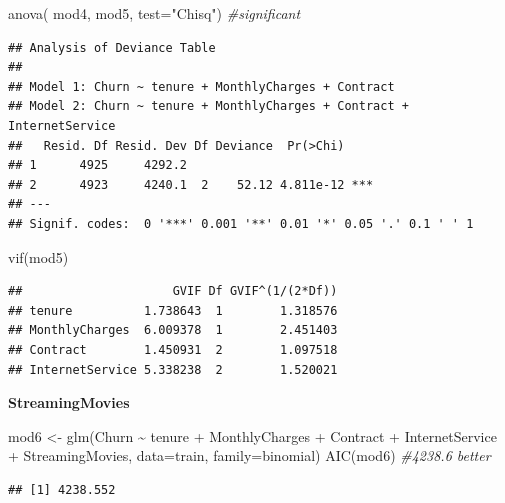 \documentclass[
  twoside]{article}
\newenvironment{Shaded}{\begin{snugshade}}{\end{snugshade}}
\newcommand{\AttributeTok}[1]{\textcolor[rgb]{0.77,0.63,0.00}{#1}}
\newcommand{\CommentTok}[1]{\textcolor[rgb]{0.56,0.35,0.01}{\textit{#1}}}
\newcommand{\FunctionTok}[1]{\textcolor[rgb]{0.00,0.00,0.00}{#1}}
\newcommand{\NormalTok}[1]{#1}
\newcommand{\OtherTok}[1]{\textcolor[rgb]{0.56,0.35,0.01}{#1}}
\newcommand{\SpecialCharTok}[1]{\textcolor[rgb]{0.00,0.00,0.00}{#1}}
\newcommand{\StringTok}[1]{\textcolor[rgb]{0.31,0.60,0.02}{#1}}
\begin{document}
\begin{Shaded}
\begin{Highlighting}[]
\FunctionTok{anova}\NormalTok{( mod4, mod5,  }\AttributeTok{test=}\StringTok{"Chisq"}\NormalTok{) }\CommentTok{\#significant}
\end{Highlighting}
\end{Shaded}

\begin{verbatim}
## Analysis of Deviance Table
## 
## Model 1: Churn ~ tenure + MonthlyCharges + Contract
## Model 2: Churn ~ tenure + MonthlyCharges + Contract + InternetService
##   Resid. Df Resid. Dev Df Deviance  Pr(>Chi)    
## 1      4925     4292.2                          
## 2      4923     4240.1  2    52.12 4.811e-12 ***
## ---
## Signif. codes:  0 '***' 0.001 '**' 0.01 '*' 0.05 '.' 0.1 ' ' 1
\end{verbatim}

\begin{Shaded}
\begin{Highlighting}[]
\FunctionTok{vif}\NormalTok{(mod5)}
\end{Highlighting}
\end{Shaded}

\begin{verbatim}
##                     GVIF Df GVIF^(1/(2*Df))
## tenure          1.738643  1        1.318576
## MonthlyCharges  6.009378  1        2.451403
## Contract        1.450931  2        1.097518
## InternetService 5.338238  2        1.520021
\end{verbatim}

\textbf{StreamingMovies}

\begin{Shaded}
\begin{Highlighting}[]
\NormalTok{mod6 }\OtherTok{\textless{}{-}} \FunctionTok{glm}\NormalTok{(Churn }\SpecialCharTok{\textasciitilde{}}\NormalTok{ tenure }\SpecialCharTok{+}\NormalTok{ MonthlyCharges }\SpecialCharTok{+}\NormalTok{ Contract }\SpecialCharTok{+}\NormalTok{ InternetService }\SpecialCharTok{+} 
\NormalTok{              StreamingMovies, }\AttributeTok{data=}\NormalTok{train, }\AttributeTok{family=}\NormalTok{binomial)}
\FunctionTok{AIC}\NormalTok{(mod6) }\CommentTok{\#4238.6 better}
\end{Highlighting}
\end{Shaded}

\begin{verbatim}
## [1] 4238.552
\end{verbatim}
\end{document}
